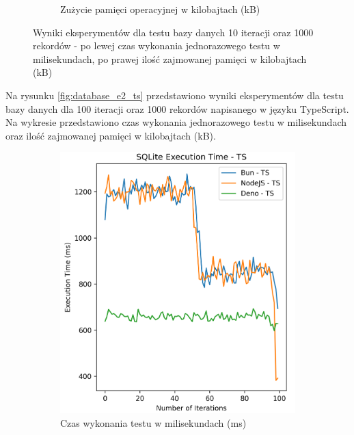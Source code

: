 \begin{figure}[H]
\begin{subfigure}[b]{0.4\textwidth}
    \caption{Zużycie pamięci operacyjnej w kilobajtach (kB)}
    \label{fig:database_e2_js_memory}
  \end{subfigure}
  \caption{Wyniki eksperymentów dla testu bazy danych 10 iteracji oraz 1000 rekordów - po lewej czas wykonania jednorazowego testu w milisekundach, po prawej ilość zajmowanej pamięci w kilobajtach (kB)}
  \label{fig:database_e2_js}
\end{figure}

Na rysunku \ref{fig:database_e2_ts} przedstawiono wyniki eksperymentów dla testu bazy danych dla 100 iteracji oraz 1000 rekordów napisanego w języku TypeScript. Na wykresie przedstawiono czas wykonania jednorazowego testu w milisekundach oraz ilość zajmowanej pamięci w kilobajtach (kB).

\begin{figure}[H]
  \centering
  \begin{subfigure}[b]{0.4\textwidth}
    \centering
    \includegraphics[width=\textwidth]{Figures/database/sqlite_100_1000_ts_time.png}
    \caption{Czas wykonania testu w milisekundach (ms)}
    \label{fig:database_e2_ts_time}
  \end{subfigure}
  \begin{subfigure}[b]{0.4\textwidth}

\end{subfigure}
\end{figure}
